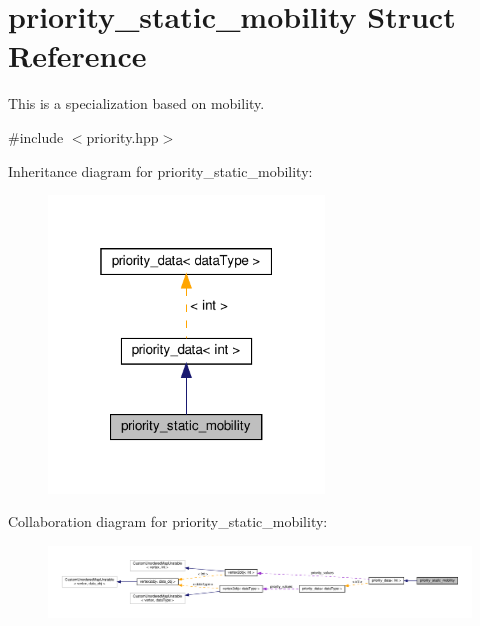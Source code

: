 \hypertarget{structpriority__static__mobility}{}\section{priority\+\_\+static\+\_\+mobility Struct Reference}
\label{structpriority__static__mobility}


This is a specialization based on mobility.  




{\ttfamily \#include $<$priority.\+hpp$>$}



Inheritance diagram for priority\+\_\+static\+\_\+mobility\+:
\nopagebreak
\begin{figure}[H]
\begin{center}
\leavevmode
\includegraphics[width=208pt]{d9/db7/structpriority__static__mobility__inherit__graph}
\end{center}
\end{figure}


Collaboration diagram for priority\+\_\+static\+\_\+mobility\+:
\nopagebreak
\begin{figure}[H]
\begin{center}
\leavevmode
\includegraphics[width=350pt]{d3/dc1/structpriority__static__mobility__coll__graph}
\end{center}
\end{figure}
